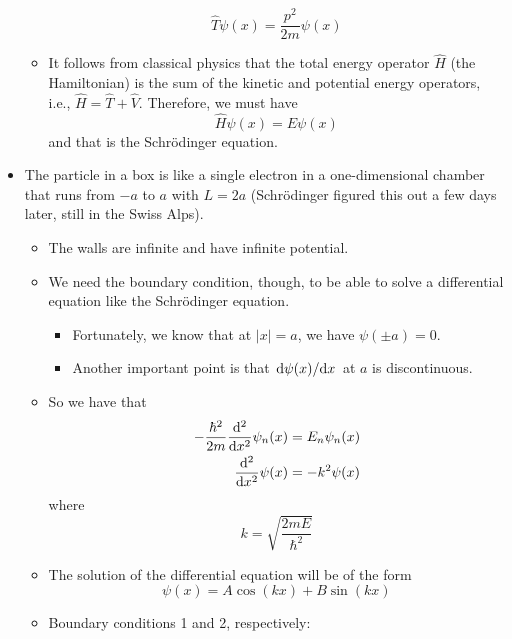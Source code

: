 \documentclass[../notes.tex]{subfiles}
\begin{document}
\begin{itemize}
\begin{itemize}
        \begin{equation*}
            \hat{T}\psi(x) = \frac{p^2}{2m}\psi(x)
        \end{equation*}
        \item It follows from classical physics that the total energy operator $\hat{H}$ (the Hamiltonian) is the sum of the kinetic and potential energy operators, i.e., $\hat{H}=\hat{T}+\hat{V}$. Therefore, we must have
        \begin{equation*}
            \hat{H}\psi(x) = E\psi(x)
        \end{equation*}
        and that is the Schr\"{o}dinger equation.
    \end{itemize}
    \item The particle in a box is like a single electron in a one-dimensional chamber that runs from $-a$ to $a$ with $L=2a$ (Schr\"{o}dinger figured this out a few days later, still in the Swiss Alps).
    \begin{itemize}
        \item The walls are infinite and have infinite potential.
        \item We need the boundary condition, though, to be able to solve a differential equation like the Schr\"{o}dinger equation.
        \begin{itemize}
            \item Fortunately, we know that at $|x|=a$, we have $\psi(\pm a)=0$.
            \item Another important point is that $\dv*{\psi(x)}{x}$ at $a$ is discontinuous.
        \end{itemize}
        \item So we have that
        \begin{align*}
            -\frac{\hbar^2}{2m}\dv[2]{x}\psi_n(x) &= E_n\psi_n(x)\\
            \dv[2]{x}\psi(x) &= -k^2\psi(x)
        \end{align*}
        where
        \begin{equation*}
            k = \sqrt{\frac{2mE}{\hbar^2}}
        \end{equation*}
        \item The solution of the differential equation will be of the form
        \begin{equation*}
            \psi(x) = A\cos(kx)+B\sin(kx)
        \end{equation*}
        \item Boundary conditions 1 and 2, respectively:

\end{itemize}
\end{itemize}
\end{document}

